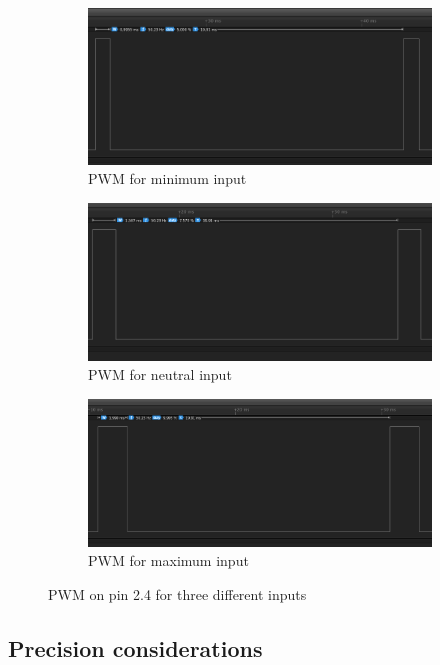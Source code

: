 \documentclass[12pt,a4paper]{article}
\begin{document}
\begin{figure}[h]
	\centering
	\begin{subfigure}{\textwidth}
		\centering
		\includegraphics[width=.9\linewidth]{pwm_low}
		\caption{PWM for minimum input}
		\label{fig:pwmlow}
	\end{subfigure}
	\begin{subfigure}{\textwidth}
		\centering
		\includegraphics[width=.9\linewidth]{pwm_neutral}
		\caption{PWM for neutral input}
		\label{fig:pwmneutral}
	\end{subfigure}
	\begin{subfigure}{\textwidth}
		\centering
		\includegraphics[width=.9\linewidth]{pwm_high}
		\caption{PWM for maximum input}
		\label{fig:pwmhigh}
	\end{subfigure}
	\caption{PWM on pin 2.4 for three different inputs}
	\label{fig:pwm}
\end{figure}

\subsection{Precision considerations}
\end{document}
